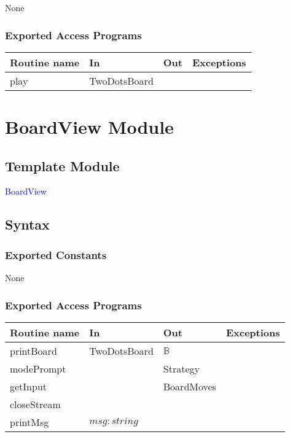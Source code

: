 \documentclass[12pt]{article}
\begin{document}
None

\subsubsection* {Exported Access Programs}

\begin{tabular}{| l | l | l | p{6cm} |}
\hline
\textbf{Routine name} & \textbf{In} & \textbf{Out} & \textbf{Exceptions}\\
\hline
play & TwoDotsBoard & & \\
\hline
\end{tabular}

\newpage

\section* {BoardView Module}

\subsection* {Template Module}

\noindent \textcolor{blue}{BoardView}

\subsection* {Syntax}

\subsubsection* {Exported Constants}

None

\subsubsection* {Exported Access Programs}

\begin{tabular}{| l | l | l | p{6cm} |}
\hline
\textbf{Routine name} & \textbf{In} & \textbf{Out} & \textbf{Exceptions}\\
\hline
printBoard & TwoDotsBoard & $\mathbb{B}$& \\
\hline
modePrompt &  & Strategy & \\
\hline
getInput &  & BoardMoves & \\
\hline
closeStream &  &  & \\
\hline
printMsg & $msg : string$ &  & \\
\hline

\end{tabular}
\end{document}
